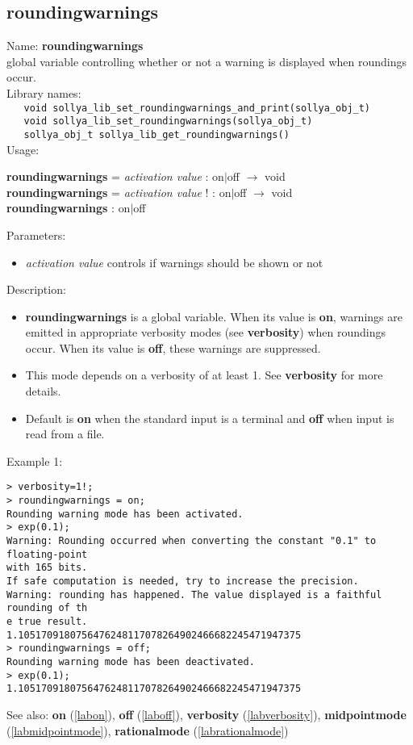 \subsection{roundingwarnings}
\label{labroundingwarnings}
\noindent Name: \textbf{roundingwarnings}\\
\phantom{aaa}global variable controlling whether or not a warning is displayed when roundings occur.\\[0.2cm]
\noindent Library names:\\
\verb|   void sollya_lib_set_roundingwarnings_and_print(sollya_obj_t)|\\
\verb|   void sollya_lib_set_roundingwarnings(sollya_obj_t)|\\
\verb|   sollya_obj_t sollya_lib_get_roundingwarnings()|\\[0.2cm]
\noindent Usage: 
\begin{center}
\textbf{roundingwarnings} = \emph{activation value} : \textsf{on$|$off} $\rightarrow$ \textsf{void}\\
\textbf{roundingwarnings} = \emph{activation value} ! : \textsf{on$|$off} $\rightarrow$ \textsf{void}\\
\textbf{roundingwarnings} : \textsf{on$|$off}\\
\end{center}
Parameters: 
\begin{itemize}
\item \emph{activation value} controls if warnings should be shown or not
\end{itemize}
\noindent Description: \begin{itemize}

\item \textbf{roundingwarnings} is a global variable. When its value is \textbf{on}, warnings are
   emitted in appropriate verbosity modes (see \textbf{verbosity}) when roundings
   occur.  When its value is \textbf{off}, these warnings are suppressed.

\item This mode depends on a verbosity of at least 1. See
   \textbf{verbosity} for more details.

\item Default is \textbf{on} when the standard input is a terminal and
   \textbf{off} when \sollya input is read from a file.
\end{itemize}
\noindent Example 1: 
\begin{center}\begin{minipage}{15cm}\begin{Verbatim}[frame=single]
> verbosity=1!;
> roundingwarnings = on;
Rounding warning mode has been activated.
> exp(0.1);
Warning: Rounding occurred when converting the constant "0.1" to floating-point 
with 165 bits.
If safe computation is needed, try to increase the precision.
Warning: rounding has happened. The value displayed is a faithful rounding of th
e true result.
1.1051709180756476248117078264902466682245471947375
> roundingwarnings = off;
Rounding warning mode has been deactivated.
> exp(0.1);
1.1051709180756476248117078264902466682245471947375
\end{Verbatim}
\end{minipage}\end{center}
See also: \textbf{on} (\ref{labon}), \textbf{off} (\ref{laboff}), \textbf{verbosity} (\ref{labverbosity}), \textbf{midpointmode} (\ref{labmidpointmode}), \textbf{rationalmode} (\ref{labrationalmode})
